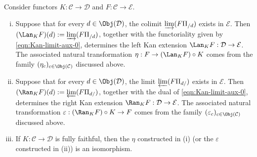 \begin{theorem}\label{prop:Kan-limit}
	Consider functors $K: \mathcal{C} \to \mathcal{D}$ and
	$F: \mathcal{C} \to \mathcal{E}$.
	\begin{enumerate}[(i)]
		\item Suppose that for every $d \in \Obj(\mathcal{D})$, the colimit
		$\varinjlim(F\Pi_{/d})$ exists in $\mathcal{E}$. Then
		$(\Lan_K F)(d) := \varinjlim(F\Pi_{/d})$, together with the
		functoriality given by \eqref{eqn:Kan-limit-aux-0}, determines the left
		Kan extension $\Lan_K F: \mathcal{D} \to \mathcal{E}$. The associated
		natural transformation $\eta: F \to (\Lan_K F)\circ K$ comes from the
		family $(\eta_c)_{c\in\Obj(\mathcal{C})}$ discussed above.
		\item Suppose that for every $d \in \Obj(\mathcal{D})$, the limit
		$\varprojlim(F\Pi_{d/})$ exists in $\mathcal{E}$. Then
		$(\Ran_K F)(d) := \varprojlim(F\Pi_{d/})$, together with the dual of
		\eqref{eqn:Kan-limit-aux-0}, determines the right Kan extension
		$\Ran_K F: \mathcal{D} \to \mathcal{E}$. The associated natural
		transformation $\varepsilon: (\Ran_K F)\circ K \to F$ comes from the
		family $(\varepsilon_c)_{c\in\Obj(\mathcal{C})}$ discussed above.
		\item If $K: \mathcal{C} \to \mathcal{D}$ is fully faithful, then the
		$\eta$ constructed in (i) (or the $\varepsilon$ constructed in (ii)) is
		an isomorphism.
	\end{enumerate}
\end{theorem}
